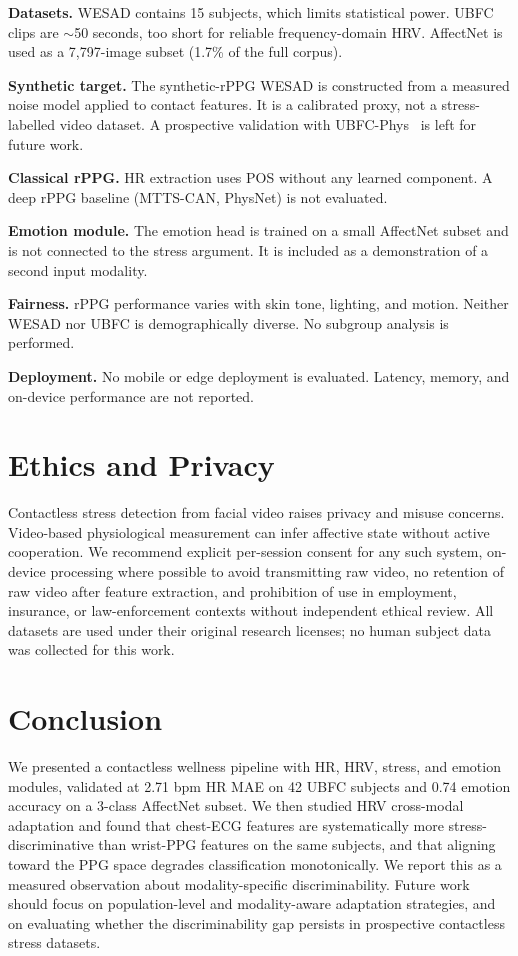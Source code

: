 \documentclass[conference]{IEEEtran}
\begin{document}
\textbf{Datasets.} WESAD contains 15 subjects, which limits statistical
power. UBFC clips are $\sim$50 seconds, too short for reliable
frequency-domain HRV. AffectNet is used as a 7{,}797-image subset
(1.7\% of the full corpus).

\textbf{Synthetic target.} The synthetic-rPPG WESAD is constructed
from a measured noise model applied to contact features. It is a
calibrated proxy, not a stress-labelled video dataset. A prospective
validation with UBFC-Phys~\cite{meziati2021} is left for future work.

\textbf{Classical rPPG.} HR extraction uses POS without any learned
component. A deep rPPG baseline (MTTS-CAN, PhysNet) is not evaluated.

\textbf{Emotion module.} The emotion head is trained on a small
AffectNet subset and is not connected to the stress argument. It is
included as a demonstration of a second input modality.

\textbf{Fairness.} rPPG performance varies with skin tone, lighting,
and motion. Neither WESAD nor UBFC is demographically diverse. No
subgroup analysis is performed.

\textbf{Deployment.} No mobile or edge deployment is evaluated.
Latency, memory, and on-device performance are not reported.

\section{Ethics and Privacy}

Contactless stress detection from facial video raises privacy and
misuse concerns. Video-based physiological measurement can infer
affective state without active cooperation. We recommend explicit
per-session consent for any such system, on-device processing where
possible to avoid transmitting raw video, no retention of raw video
after feature extraction, and prohibition of use in employment,
insurance, or law-enforcement contexts without independent ethical
review. All datasets are used under their original research licenses;
no human subject data was collected for this work.

\section{Conclusion}

We presented a contactless wellness pipeline with HR, HRV, stress, and
emotion modules, validated at 2.71 bpm HR MAE on 42 UBFC subjects and
0.74 emotion accuracy on a 3-class AffectNet subset. We then studied
HRV cross-modal adaptation and found that chest-ECG features are
systematically more stress-discriminative than wrist-PPG features on
the same subjects, and that aligning toward the PPG space degrades
classification monotonically. We report this as a measured observation
about modality-specific discriminability. Future work should focus on
population-level and modality-aware adaptation strategies, and on
evaluating whether the discriminability gap persists in prospective
contactless stress datasets.
\end{document}

